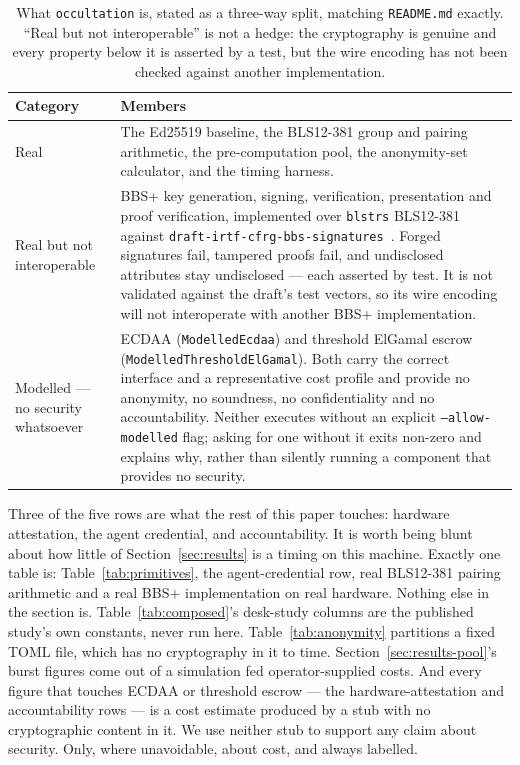 \documentclass[11pt]{article}
\newcommand{\occultation}{\texttt{occultation}}
\begin{document}
\begin{table}[h]
\centering\small
\caption{What \occultation{} is, stated as a three-way split, matching
\texttt{README.md} exactly. ``Real but not interoperable'' is not a hedge:
the cryptography is genuine and every property below it is asserted by a
test, but the wire encoding has not been checked against another
implementation.}
\label{tab:boundary}
\begin{tabular}{@{}p{2.8cm}p{9.9cm}@{}}
\toprule
\textbf{Category} & \textbf{Members} \\
\midrule
Real &
The Ed25519 baseline, the BLS12-381 group and pairing arithmetic, the
pre-computation pool, the anonymity-set calculator, and the timing
harness. \\
\addlinespace
Real but not interoperable &
BBS+ key generation, signing, verification, presentation and proof
verification, implemented over \texttt{blstrs} BLS12-381 against
\texttt{draft-irtf-cfrg-bbs-signatures}~\cite{bbsdraft}. Forged signatures
fail, tampered proofs fail, and undisclosed attributes stay undisclosed ---
each asserted by test. It is not validated against the draft's test
vectors, so its wire encoding will not interoperate with another BBS+
implementation. \\
\addlinespace
Modelled --- no security whatsoever &
ECDAA (\texttt{ModelledEcdaa}) and threshold ElGamal escrow
(\texttt{ModelledThresholdElGamal}). Both carry the correct interface and a
representative cost profile and provide no anonymity, no soundness, no
confidentiality and no accountability. Neither executes without an explicit
\texttt{--allow-modelled} flag; asking for one without it exits non-zero and
explains why, rather than silently running a component that provides no
security. \\
\bottomrule
\end{tabular}
\end{table}

Three of the five rows are what the rest of this paper touches: hardware
attestation, the agent credential, and accountability. It is worth being
blunt about how little of Section~\ref{sec:results} is a timing on this
machine. Exactly one table is: Table~\ref{tab:primitives}, the
agent-credential row, real BLS12-381 pairing arithmetic and a real BBS+
implementation on real hardware. Nothing else in the section is.
Table~\ref{tab:composed}'s desk-study columns are the published study's own
constants, never run here. Table~\ref{tab:anonymity} partitions a fixed TOML
file, which has no cryptography in it to time.
Section~\ref{sec:results-pool}'s burst figures come out of a simulation fed
operator-supplied costs. And every figure that touches ECDAA or threshold
escrow --- the hardware-attestation and accountability rows --- is a cost
estimate produced by a stub with no cryptographic content in it. We use
neither stub to support any claim about security. Only, where unavoidable,
about cost, and always labelled.
\end{document}
